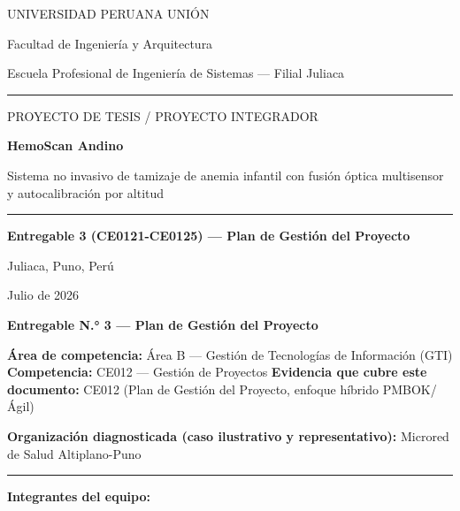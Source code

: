 \documentclass[11pt,a4paper]{article}
\begin{document}
\begin{titlepage}
\centering
\vspace*{1.2cm}
{\large UNIVERSIDAD PERUANA UNI\'ON\par}
{\normalsize Facultad de Ingenier\'ia y Arquitectura\par}
{\normalsize Escuela Profesional de Ingenier\'ia de Sistemas --- Filial Juliaca\par}
\vspace{0.5cm}
\rule{0.6\linewidth}{0.4pt}
\vspace{1.6cm}

{\large PROYECTO DE TESIS / PROYECTO INTEGRADOR\par}
\vspace{1.0cm}
{\huge\bfseries HemoScan Andino\par}
\vspace{0.6cm}
{\Large Sistema no invasivo de tamizaje de anemia infantil con fusi\'on \'optica multisensor y autocalibraci\'on por altitud\par}
\vspace{1.6cm}
\rule{0.6\linewidth}{0.4pt}
\vspace{1.6cm}

{\Large\bfseries Entregable 3 (CE0121-CE0125) --- Plan de Gesti\'on del Proyecto\par}
\vspace{2.0cm}

{\normalsize Juliaca, Puno, Per\'u \par}
{\normalsize Julio de 2026\par}

\vfill
\end{titlepage}

\tableofcontents
\newpage

\textbf{Entregable N.° 3 --- Plan de Gestión del Proyecto}

\textbf{Área de competencia:} Área B --- Gestión de Tecnologías de Información (GTI)
\textbf{Competencia:} CE012 --- Gestión de Proyectos
\textbf{Evidencia que cubre este documento:} CE012 (Plan de Gestión del Proyecto, enfoque híbrido PMBOK/Ágil)

\textbf{Organización diagnosticada (caso ilustrativo y representativo):} Microred de Salud Altiplano-Puno

\begin{center}\rule{0.5\linewidth}{0.5pt}\end{center}

\textbf{Integrantes del equipo:}
\end{document}
